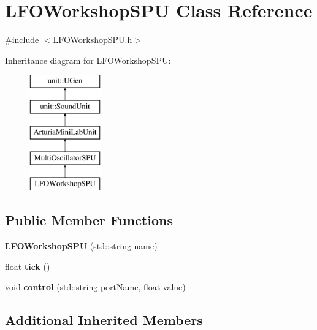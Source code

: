 \hypertarget{classLFOWorkshopSPU}{}\section{L\+F\+O\+Workshop\+S\+PU Class Reference}
\label{classLFOWorkshopSPU}


{\ttfamily \#include $<$L\+F\+O\+Workshop\+S\+P\+U.\+h$>$}

Inheritance diagram for L\+F\+O\+Workshop\+S\+PU\+:\begin{figure}[H]
\begin{center}
\leavevmode
\includegraphics[height=5.000000cm]{classLFOWorkshopSPU}
\end{center}
\end{figure}
\subsection*{Public Member Functions}
\begin{DoxyCompactItemize}
\item 
{\bfseries L\+F\+O\+Workshop\+S\+PU} (std\+::string name)\hypertarget{classLFOWorkshopSPU_af0da7426287c75e69999066976565005}{}\label{classLFOWorkshopSPU_af0da7426287c75e69999066976565005}

\item 
float {\bfseries tick} ()\hypertarget{classLFOWorkshopSPU_a0af8aaed492cecf1b6d3bf416393a8d1}{}\label{classLFOWorkshopSPU_a0af8aaed492cecf1b6d3bf416393a8d1}

\item 
void {\bfseries control} (std\+::string port\+Name, float value)\hypertarget{classLFOWorkshopSPU_a3c139a87ec2ec0c9cfa149f7652b11f8}{}\label{classLFOWorkshopSPU_a3c139a87ec2ec0c9cfa149f7652b11f8}

\end{DoxyCompactItemize}
\subsection*{Additional Inherited Members}


